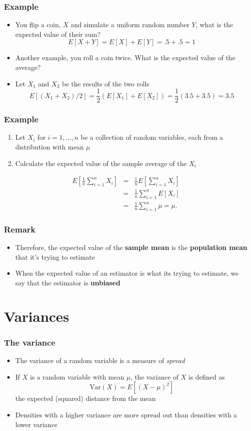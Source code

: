 \documentclass[aspectratio=169]{beamer}
\newcommand{\Var}{\mathrm{Var}}
\begin{document}
\begin{frame}\frametitle{Example}
  \begin{itemize}
  \item  You flip a coin, $X$ and simulate a uniform random number $Y$, what 
    is the expected value of their sum? 
    $$
    E[X + Y] = E[X] + E[Y] = .5 + .5 = 1
    $$ 
  \item Another example, you roll a coin twice. What is the expected value of
    the average? 
  \item Let $X_1$ and $X_2$ be the results of the two rolls
    $$
    E[(X_1 + X_2) / 2] = \frac{1}{2}(E[X_1] + E[X_2])
    = \frac{1}{2}(3.5 + 3.5) = 3.5
    $$
  \end{itemize}
\end{frame}


\begin{frame}\frametitle{Example}
  \begin{enumerate}
  \item Let $X_i$ for $i=1,\ldots,n$ be a collection of random
    variables, each from a distribution with mean $\mu$
  \item Calculate the expected value of the sample average of the $X_i$
  \end{enumerate}
  \begin{eqnarray*}
    E\left[ \frac{1}{n}\sum_{i=1}^n X_i\right]
    & = & \frac{1}{n} E\left[\sum_{i=1}^n X_i\right] \\
    & = & \frac{1}{n} \sum_{i=1}^n E\left[X_i\right] \\
    & = & \frac{1}{n} \sum_{i=1}^n \mu =  \mu.
  \end{eqnarray*}
\end{frame}

\begin{frame}
  \frametitle{Remark}
  \begin{itemize}
  \item Therefore, the expected value of the {\bf sample mean} is the {\bf
      population mean} that it's trying to estimate
  \item When the expected value of an estimator is what its trying to estimate,
    we say that the estimator is {\bf unbiased}
  \end{itemize}
\end{frame}


\section{Variances}
\begin{frame}\frametitle{The variance}
  \begin{itemize}
  \item The variance of a random variable is a measure of {\em spread}
  \item If $X$ is a random variable with mean $\mu$, the variance of 
    $X$ is defined as
    $$
    \Var(X) = E[(X - \mu)^2]
    $$
    the expected (squared) distance from the mean
  \item Densities with a higher variance are more spread out than
    densities with a lower variance
  \end{itemize}
\end{frame}
\end{document}
